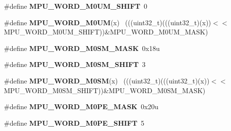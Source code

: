 \begin{DoxyCompactItemize}
\item 
\hypertarget{group___m_p_u___register___masks_ga636500a039c88639b9b03b0624e934ce}{}\#define {\bfseries M\+P\+U\+\_\+\+W\+O\+R\+D\+\_\+\+M0\+U\+M\+\_\+\+S\+H\+I\+F\+T}~0\label{group___m_p_u___register___masks_ga636500a039c88639b9b03b0624e934ce}

\item 
\hypertarget{group___m_p_u___register___masks_gac8ad5fbbc8d2e40ebb08b042feb3e74b}{}\#define {\bfseries M\+P\+U\+\_\+\+W\+O\+R\+D\+\_\+\+M0\+U\+M}(x)                                              ~(((uint32\+\_\+t)(((uint32\+\_\+t)(x))$<$$<$M\+P\+U\+\_\+\+W\+O\+R\+D\+\_\+\+M0\+U\+M\+\_\+\+S\+H\+I\+F\+T))\&M\+P\+U\+\_\+\+W\+O\+R\+D\+\_\+\+M0\+U\+M\+\_\+\+M\+A\+S\+K)\label{group___m_p_u___register___masks_gac8ad5fbbc8d2e40ebb08b042feb3e74b}

\item 
\hypertarget{group___m_p_u___register___masks_gafda0a1d29fd430d9445e755ca6966426}{}\#define {\bfseries M\+P\+U\+\_\+\+W\+O\+R\+D\+\_\+\+M0\+S\+M\+\_\+\+M\+A\+S\+K}~0x18u\label{group___m_p_u___register___masks_gafda0a1d29fd430d9445e755ca6966426}

\item 
\hypertarget{group___m_p_u___register___masks_ga71cd35cba4582e00c7461d7c65b8756b}{}\#define {\bfseries M\+P\+U\+\_\+\+W\+O\+R\+D\+\_\+\+M0\+S\+M\+\_\+\+S\+H\+I\+F\+T}~3\label{group___m_p_u___register___masks_ga71cd35cba4582e00c7461d7c65b8756b}

\item 
\hypertarget{group___m_p_u___register___masks_ga3223afbff439164af87eac4fe36c5594}{}\#define {\bfseries M\+P\+U\+\_\+\+W\+O\+R\+D\+\_\+\+M0\+S\+M}(x)                                              ~(((uint32\+\_\+t)(((uint32\+\_\+t)(x))$<$$<$M\+P\+U\+\_\+\+W\+O\+R\+D\+\_\+\+M0\+S\+M\+\_\+\+S\+H\+I\+F\+T))\&M\+P\+U\+\_\+\+W\+O\+R\+D\+\_\+\+M0\+S\+M\+\_\+\+M\+A\+S\+K)\label{group___m_p_u___register___masks_ga3223afbff439164af87eac4fe36c5594}

\item 
\hypertarget{group___m_p_u___register___masks_gaf73ab1ad40c518ff22b6577b70bf99cc}{}\#define {\bfseries M\+P\+U\+\_\+\+W\+O\+R\+D\+\_\+\+M0\+P\+E\+\_\+\+M\+A\+S\+K}~0x20u\label{group___m_p_u___register___masks_gaf73ab1ad40c518ff22b6577b70bf99cc}

\item 
\hypertarget{group___m_p_u___register___masks_ga7b9c85b27f809d1b74cb271b796f2cb4}{}\#define {\bfseries M\+P\+U\+\_\+\+W\+O\+R\+D\+\_\+\+M0\+P\+E\+\_\+\+S\+H\+I\+F\+T}~5\label{group___m_p_u___register___masks_ga7b9c85b27f809d1b74cb271b796f2cb4}


\end{DoxyCompactItemize}
